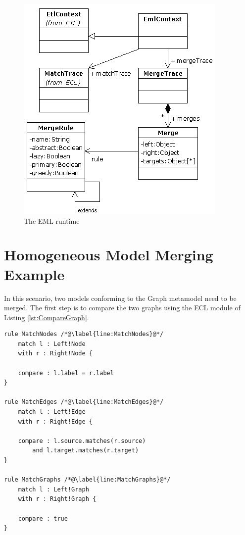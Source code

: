 \begin{figure}
	\centering
		\includegraphics{images/EmlRuntime.png}
	\caption{The EML runtime}
	\label{fig:EmlRuntime}
\end{figure}

\section{Homogeneous Model Merging Example}

In this scenario, two models conforming to the Graph metamodel need to be merged. The first step is to compare the two graphs using the ECL module of Listing \ref{lst:CompareGraph}.

\begin{lstlisting}[caption=ECL module for comparing two instances of the Graph metamodel, label=lst:CompareGraph, language=ECL, tabsize=2]
rule MatchNodes /*@\label{line:MatchNodes}@*/
	match l : Left!Node
	with r : Right!Node {

	compare : l.label = r.label
}

rule MatchEdges /*@\label{line:MatchEdges}@*/
	match l : Left!Edge
	with r : Right!Edge {

	compare : l.source.matches(r.source)
		and l.target.matches(r.target)
}

rule MatchGraphs /*@\label{line:MatchGraphs}@*/
	match l : Left!Graph
	with r : Right!Graph {

	compare : true
}
\end{lstlisting}

